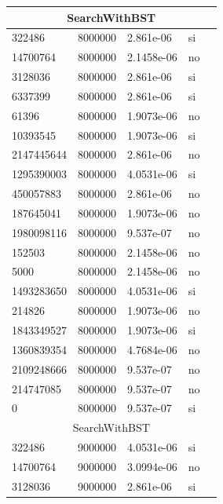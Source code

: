 \documentclass[12pt, fleqn]{article}                             %
\theoremstyle{break}                                            %
\begin{document}
\begin{longtable}{|m{5em}|m{5em}|m{10em}|m{5em}|@{}m{0pt}@{}}
            \multicolumn{5}{|c|}{SearchWithBST}   \\          \hline
            322486& 8000000  & 2.861e-06 & si &\\[1em]    \hline
            14700764& 8000000  & 2.1458e-06 & no &\\[1em]    \hline
            3128036& 8000000  & 2.861e-06 & si &\\[1em]    \hline
            6337399& 8000000  & 2.861e-06 & si &\\[1em]    \hline
            61396& 8000000  & 1.9073e-06 & no &\\[1em]    \hline
            10393545& 8000000  & 1.9073e-06 & si &\\[1em]    \hline
            2147445644& 8000000  & 2.861e-06 & no &\\[1em]    \hline
            1295390003& 8000000  & 4.0531e-06 & si &\\[1em]    \hline
            450057883& 8000000  & 2.861e-06 & no &\\[1em]    \hline
            187645041& 8000000  & 1.9073e-06 & no &\\[1em]    \hline
            1980098116& 8000000  & 9.537e-07 & no &\\[1em]    \hline
            152503& 8000000  & 2.1458e-06 & no &\\[1em]    \hline
            5000& 8000000  & 2.1458e-06 & no &\\[1em]    \hline
            1493283650& 8000000  & 4.0531e-06 & si &\\[1em]    \hline
            214826& 8000000  & 1.9073e-06 & no &\\[1em]    \hline
            1843349527& 8000000  & 1.9073e-06 & si &\\[1em]    \hline
            1360839354& 8000000  & 4.7684e-06 & no &\\[1em]    \hline
            2109248666& 8000000  & 9.537e-07 & no &\\[1em]    \hline
            214747085& 8000000  & 9.537e-07 & no &\\[1em]    \hline
            0& 8000000  & 9.537e-07 & si &\\[1em]    \hline
            \multicolumn{5}{|c|}{SearchWithBST}   \\          \hline
            322486& 9000000  & 4.0531e-06 & si &\\[1em]    \hline
            14700764& 9000000  & 3.0994e-06 & no &\\[1em]    \hline
            3128036& 9000000  & 2.861e-06 & si &\\[1em]    \hline

\end{longtable}
\end{document}
